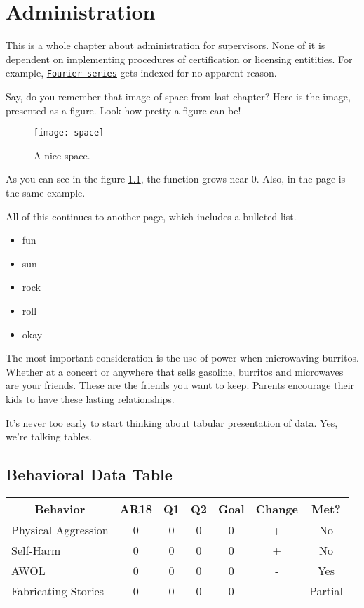 \documentclass[float=false, crop=false]{standalone}
\begin{document}
\chapter{Administration}
This is a whole chapter about administration for supervisors. None of it is dependent on implementing procedures of certification or licensing entitities. For example, \underline{\texttt{\colorbox{Dandelion}{Fourier series}}}
gets indexed for no apparent reason.

Say, do you remember that image of space from last chapter? Here is the image, presented as a figure. Look how pretty a figure can be!
\begin{figure}[h]
    \centering
    \texttt{[image: space]}
    \caption{A nice space.}
    \label{fig:space1}
\end{figure}
 
As you can see in the figure \ref{fig:space1}, the 
function grows near 0. Also, in the page \pageref{fig:space1} 
is the same example.
 
All of this continues to another page, which includes a bulleted list.
\begin{itemize}
\item fun
\item sun 
\item rock
\item roll
\item okay
\end{itemize}

The most important consideration is the use of power when microwaving burritos. Whether at a concert or anywhere that sells gasoline, burritos and microwaves are your friends. These are the friends you want to keep. Parents encourage their kids to have these lasting relationships. 

It's never too early to start thinking about tabular presentation of data. Yes, we're talking tables.

\section{Behavioral Data Table}
\begin{table}[H]
\begin{tabular}{|l|cccccc|}
\hline
\multicolumn{1}{|c|}{Behavior} & AR18 & Q1 & Q2 & Goal & Change & Met?\\\hline
Physical Aggression            & 0    & 0  & 0  & 0    & +      & No\\
Self-Harm                      & 0    & 0  & 0  & 0    & +      & No\\
AWOL                           & 0    & 0  & 0  & 0    & -      & Yes\\
Fabricating Stories            & 0    & 0  & 0  & 0    & -      & Partial\\ \hline
\end{tabular}
\label{tbl:simplebehavioral}
\end{table}
\end{document}
